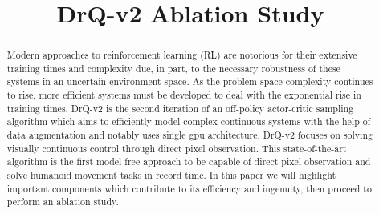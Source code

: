 \documentclass[conference]{./IEEEtran/IEEEtran} %
\begin{document}
    \title{DrQ-v2 Ablation Study}

    \author{
        \and
        \and
    }

    \maketitle

    \begin{abstract}
        
    Modern approaches to reinforcement learning (RL) are notorious for their extensive training times and complexity due, in part, 
    to the necessary robustness of these systems in an uncertain environment space. As the problem space complexity continues to rise, 
    more efficient systems must be developed to deal with the exponential rise in training times. DrQ-v2 is the second iteration of an 
    off-policy actor-critic sampling algorithm which aims to efficiently model complex continuous systems with the help of data 
    augmentation and notably uses single gpu architecture. DrQ-v2 focuses on solving visually continuous control through direct pixel 
    observation. This state-of-the-art algorithm is the first model free approach to be capable of direct pixel observation and solve 
    humanoid movement tasks in record time. In this paper we will highlight important components which contribute to its efficiency and 
    ingenuity, then proceed to perform an ablation study. 


    \end{abstract}
\end{document}
